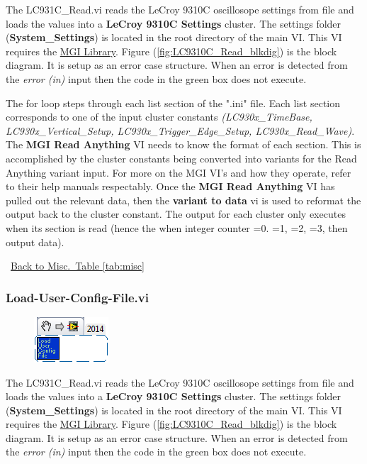 \documentclass[11pt,a4paper,oldfontcommands]{memoir}
\begin{document}
The LC931C\_Read.vi reads the LeCroy 9310C oscillosope settings from file and loads the values into a \textbf{LeCroy 9310C Settings} cluster. The settings folder (\textbf{System\_Settings}) is located in the root directory of the main VI. This VI requires the \href{http://sine.ni.com/nips/cds/view/p/lang/en/nid/209753}{MGI Library}. Figure (\ref{fig:LC9310C_Read_blkdig}) is the block diagram.  It is setup as an error case structure. When an error is detected from the \textit{error (in)} input then the code in the green box does not execute.

The for loop steps through each list section of the ".ini" file. Each list section corresponds to one of the input cluster constants \textit{(LC930x\_TimeBase, LC930x\_Vertical\_Setup, LC930x\_Trigger\_Edge\_Setup, LC930x\_Read\_Wave)}. The \textbf{MGI Read Anything} VI needs to know the format of each section. This is accomplished by the cluster constants being converted into variants for the Read Anything variant input.  For more on the MGI VI's and how they operate, refer to their help manuals respectably. Once the \textbf{MGI Read Anything} VI has pulled out the relevant data, then the \textbf{variant to data} vi is used to reformat the output back to the cluster constant. The output for each cluster only executes when its section is read (hence the when integer counter =0. =1, =2, =3, then output data).

\noindent\hrulefill\, \hyperref[tab:misc]{Back to Misc.\ Table \ref{tab:misc}}

\subsubsection{Load-User-Config-File.vi} \label{Load-User-Config-File}
\noindent\hrulefill

\begin{figure}[h]
	\includegraphics[scale=0.625]{Load-User-Config-File_main_01}
	\label{fig:Load-User-Config-File_main_01}
\end{figure}

The LC931C\_Read.vi reads the LeCroy 9310C oscillosope settings from file and loads the values into a \textbf{LeCroy 9310C Settings} cluster. The settings folder (\textbf{System\_Settings}) is located in the root directory of the main VI. This VI requires the \href{http://sine.ni.com/nips/cds/view/p/lang/en/nid/209753}{MGI Library}. Figure (\ref{fig:LC9310C_Read_blkdig}) is the block diagram.  It is setup as an error case structure. When an error is detected from the \textit{error (in)} input then the code in the green box does not execute.
\end{document}
